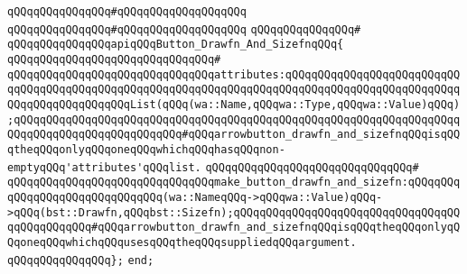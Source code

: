 \verb|qQQqqQQqqQQqqQQq#qQQqqQQqqQQqqQQqqQQq|\newline
\verb|qQQqqQQqqQQqqQQq#qQQqqQQqqQQqqQQqqQQq|\newline
\verb|qQQqqQQqqQQqqQQq#|\newline
\verb|qQQqqQQqqQQqqQQqapiqQQqButton_Drawfn_And_SizefnqQQq{|\newline
\verb|qQQqqQQqqQQqqQQqqQQqqQQqqQQqqQQq#|\newline
\verb|qQQqqQQqqQQqqQQqqQQqqQQqqQQqqQQqattributes:qQQqqQQqqQQqqQQqqQQqqQQqqQQqqQQqqQQqqQQqqQQqqQQqqQQqqQQqqQQqqQQqqQQqqQQqqQQqqQQqqQQqqQQqqQQqqQQqqQQqqQQqqQQqqQQqqQQqList(qQQq(wa::Name,qQQqwa::Type,qQQqwa::Value)qQQq);qQQqqQQqqQQqqQQqqQQqqQQqqQQqqQQqqQQqqQQqqQQqqQQqqQQqqQQqqQQqqQQqqQQqqQQqqQQqqQQqqQQqqQQqqQQqqQQq#qQQqarrowbutton_drawfn_and_sizefnqQQqisqQQqtheqQQqonlyqQQqoneqQQqwhichqQQqhasqQQqnon-emptyqQQq'attributes'qQQqlist.|\newline
\verb|qQQqqQQqqQQqqQQqqQQqqQQqqQQqqQQq#|\newline
\verb|qQQqqQQqqQQqqQQqqQQqqQQqqQQqqQQqmake_button_drawfn_and_sizefn:qQQqqQQqqQQqqQQqqQQqqQQqqQQqqQQq(wa::NameqQQq->qQQqwa::Value)qQQq->qQQq(bst::Drawfn,qQQqbst::Sizefn);qQQqqQQqqQQqqQQqqQQqqQQqqQQqqQQqqQQqqQQqqQQqqQQq#qQQqarrowbutton_drawfn_and_sizefnqQQqisqQQqtheqQQqonlyqQQqoneqQQqwhichqQQqusesqQQqtheqQQqsuppliedqQQqargument.|\newline
\verb|qQQqqQQqqQQqqQQq};|\newline
\newline
\verb|end;|\newline

